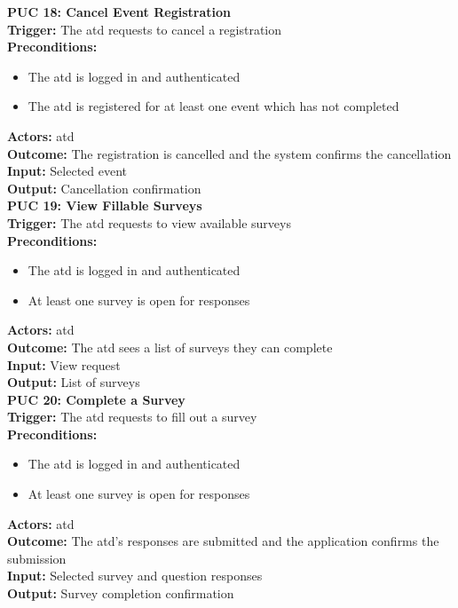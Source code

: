 \documentclass[12pt]{article}
\begin{document}
{\textbf{PUC 18: Cancel Event Registration} \\
\textbf{Trigger:} The \gls{atd} requests to cancel a registration \\
\textbf{Preconditions:}
\begin{itemize}
  \item The \gls{atd} is logged in and authenticated
  \item The \gls{atd} is registered for at least one event which has not completed
\end{itemize}
\textbf{Actors:} \Gls{atd} \\
\textbf{Outcome:} The registration is cancelled and the system confirms the cancellation \\
\textbf{Input:} Selected event \\
\textbf{Output:} Cancellation confirmation \\[1em]

\textbf{PUC 19: View Fillable Surveys} \\
\textbf{Trigger:} The \gls{atd} requests to view available surveys \\
\textbf{Preconditions:}
\begin{itemize}
  \item The \gls{atd} is logged in and authenticated
  \item At least one survey is open for responses
\end{itemize}
\textbf{Actors:} \Gls{atd} \\
\textbf{Outcome:} The \gls{atd} sees a list of surveys they can complete \\
\textbf{Input:} View request \\
\textbf{Output:} List of surveys \\[1em]

\textbf{PUC 20: Complete a Survey} \\
\textbf{Trigger:} The \gls{atd} requests to fill out a survey \\
\textbf{Preconditions:}
\begin{itemize}
  \item The \gls{atd} is logged in and authenticated
  \item At least one survey is open for responses
\end{itemize}
\textbf{Actors:} \Gls{atd} \\
\textbf{Outcome:} The \gls{atd}’s responses are submitted and the application confirms the submission \\
\textbf{Input:} Selected survey and question responses \\
\textbf{Output:} Survey completion confirmation \\[1em]

}
\end{document}
